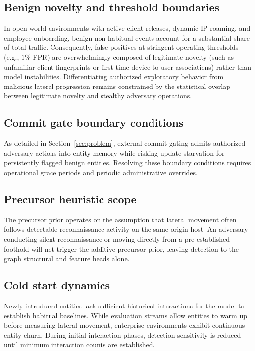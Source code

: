 \subsection{Benign novelty and threshold boundaries}

In open-world environments with active client releases, dynamic IP roaming, and employee onboarding,
benign non-habitual events account for a substantial share of total traffic. Consequently, false positives
at stringent operating thresholds (e.g., $1\%$ FPR) are overwhelmingly composed of legitimate novelty
(such as unfamiliar client fingerprints or first-time device-to-user associations) rather than model
instabilities. Differentiating authorized exploratory behavior from malicious lateral progression remains
constrained by the statistical overlap between legitimate novelty and stealthy adversary operations.

\subsection{Commit gate boundary conditions}

As detailed in Section~\ref{sec:problem}, external commit gating admits authorized
adversary actions into entity memory while risking update starvation for persistently
flagged benign entities. Resolving these boundary conditions requires operational
grace periods and periodic administrative overrides.

\subsection{Precursor heuristic scope}

The precursor prior operates on the assumption that lateral movement often follows detectable
reconnaissance activity on the same origin host. An adversary conducting silent reconnaissance
or moving directly from a pre-established foothold will not trigger the additive precursor prior,
leaving detection to the graph structural and feature heads alone.

\subsection{Cold start dynamics}

Newly introduced entities lack sufficient historical interactions for the model to establish
habitual baselines. While evaluation streams allow entities to warm up before measuring lateral
movement, enterprise environments exhibit continuous entity churn. During initial interaction
phases, detection sensitivity is reduced until minimum interaction counts are established.

